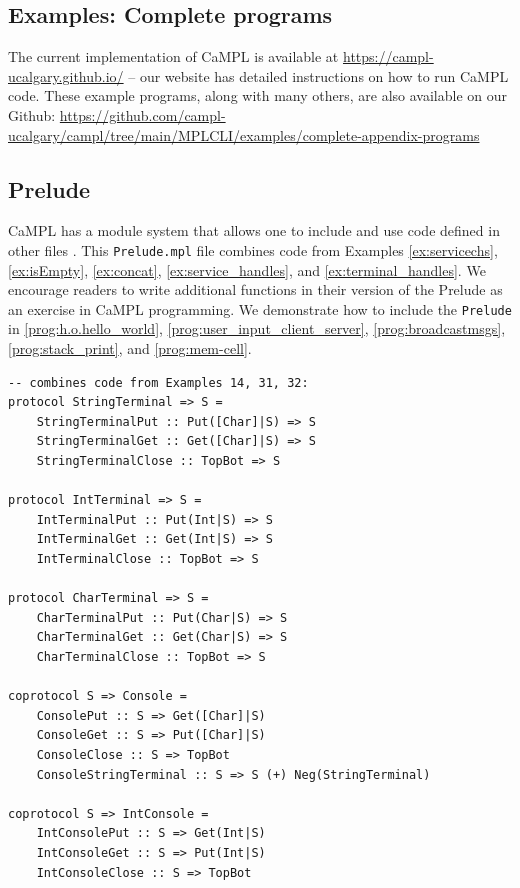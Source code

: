 \documentclass[acmsmall]{acmart}
\begin{document}
\begin{appendix}
\section{Examples: Complete programs}
\label{sec:appendix}

The current implementation of CaMPL is available at \url{https://campl-ucalgary.github.io/} -- our website has detailed instructions on how to run CaMPL code.
These example programs, along with many others, are also available on our Github:
\url{https://github.com/campl-ucalgary/campl/tree/main/MPLCLI/examples/complete-appendix-programs}

\subsection{Prelude}
\label{prog:prelude}

CaMPL has a module system that allows one to include and use code defined in other files \cite{Fo23mod}.
This \lstinline{Prelude.mpl} file combines code from Examples \ref{ex:servicechs}, \ref{ex:isEmpty}, \ref{ex:concat}, \ref{ex:service_handles}, and \ref{ex:terminal_handles}.
We encourage readers to write additional functions in their version of the Prelude as an exercise in CaMPL programming.
We demonstrate how to include the \lstinline{Prelude} in 
\ref{prog:h.o.hello_world}, \ref{prog:user_input_client_server}, \ref{prog:broadcastmsgs}, \ref{prog:stack_print}, and \ref{prog:mem-cell}.

\begin{lstlisting}
-- combines code from Examples 14, 31, 32:
protocol StringTerminal => S =
    StringTerminalPut :: Put([Char]|S) => S
    StringTerminalGet :: Get([Char]|S) => S 
    StringTerminalClose :: TopBot => S

protocol IntTerminal => S =
    IntTerminalPut :: Put(Int|S) => S
    IntTerminalGet :: Get(Int|S) => S 
    IntTerminalClose :: TopBot => S

protocol CharTerminal => S =
    CharTerminalPut :: Put(Char|S) => S
    CharTerminalGet :: Get(Char|S) => S 
    CharTerminalClose :: TopBot => S

coprotocol S => Console =
    ConsolePut :: S => Get([Char]|S) 
    ConsoleGet :: S => Put([Char]|S) 
    ConsoleClose :: S => TopBot 
    ConsoleStringTerminal :: S => S (+) Neg(StringTerminal)

coprotocol S => IntConsole =
    IntConsolePut :: S => Get(Int|S) 
    IntConsoleGet :: S => Put(Int|S) 
    IntConsoleClose :: S => TopBot 


\end{lstlisting}
\end{appendix}
\end{document}
